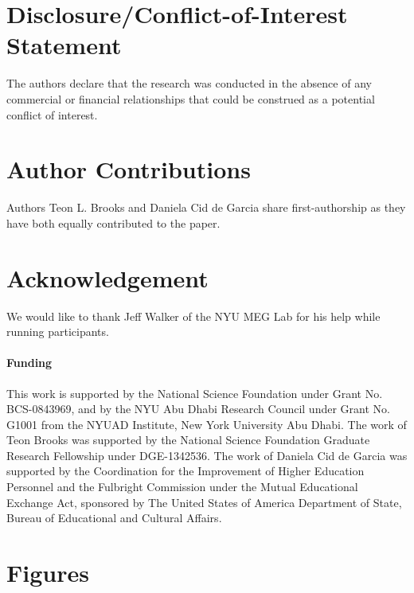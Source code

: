 \documentclass{frontiersSCNS}
\begin{document}
\section*{Disclosure/Conflict-of-Interest Statement}
The authors declare that the research was conducted in the absence of any commercial or financial relationships that could be construed as a potential conflict of interest.

\section*{Author Contributions}
Authors Teon L. Brooks and Daniela Cid de Garcia share first-authorship as they have both equally contributed to the paper.

\section*{Acknowledgement}
We would like to thank Jeff Walker of the NYU MEG Lab for his help while running participants.

\paragraph{Funding\textcolon} 		 	 	 		
					
This work is supported by the National Science Foundation under Grant No. BCS-0843969, and by the NYU Abu Dhabi Research Council under Grant No. G1001 from the NYUAD Institute, New York University Abu Dhabi.  The work of Teon Brooks was supported by the National Science Foundation Graduate Research Fellowship under DGE-1342536. The work of Daniela Cid de Garcia was supported by the Coordination for the Improvement of Higher Education Personnel and the Fulbright Commission under the Mutual Educational Exchange Act, sponsored by The United States of
America Department of State, Bureau of Educational and Cultural Affairs.



\section*{Figures}
\end{document}
